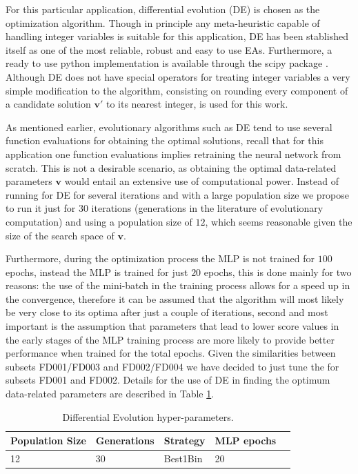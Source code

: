 \documentclass{article}
\begin{document}
For this particular application, differential evolution (DE) \cite{Storn1997} is chosen as the optimization algorithm. Though in principle any meta-heuristic capable of handling integer variables is suitable for this application, DE has been stablished itself as one of the most reliable, robust and easy to use EAs. Furthermore, a ready to use python implementation is available through the scipy package \cite{scipy}. Although DE does not have special operators for treating integer variables a very simple modification to the algorithm, consisting on rounding every component of a candidate solution $\mathbf{v}'$ to its nearest integer, is used for this work.

As mentioned earlier, evolutionary algorithms such as DE tend to use several function evaluations for obtaining the optimal solutions, recall that for this application one function evaluations implies retraining the  neural network from scratch. This is not a desirable scenario, as obtaining the optimal data-related parameters $\mathbf{v}$ would entail an extensive use of computational power. Instead of running for DE for several iterations and with a large population size we propose to run it just for $30$ iterations (generations in the literature of evolutionary computation) and using a population size of $12$, which seems reasonable given the size of the search space of $\mathbf{v}$. 

Furthermore, during the optimization process the MLP is not trained for  $100$ epochs, instead the MLP is trained for just $20$ epochs, this is done mainly for two reasons: the use of the mini-batch in the training process allows for a speed up in the convergence, therefore it can be assumed that the algorithm will most likely be very close to its optima after just a couple of iterations, second and most important is the assumption that parameters that lead to lower score values in the early stages of the MLP training process are more likely to provide better performance when trained for the total epochs. Given the similarities between subsets FD001/FD003 and FD002/FD004 we have decided to just tune the for subsets FD001 and FD002. Details for the use of DE in finding the optimum data-related parameters are described in Table \ref{table:de_hyperparams}.

\begin{table}[!htb]
\centering
\begin{tabular}{l l l l l}
	\hline
	 Population Size & Generations & Strategy & MLP epochs\\
  	\hline
  	12 & 30 & Best1Bin & 20\\
  	\hline
\end{tabular}
\caption{Differential Evolution hyper-parameters.}
\label{table:de_hyperparams}
\end{table}
\end{document}
